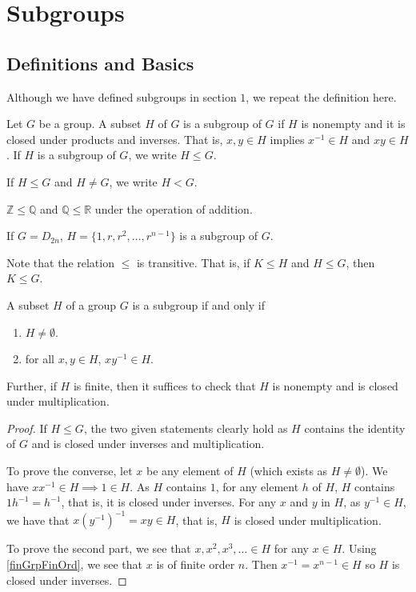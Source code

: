 \section{Subgroups}

\subsection{Definitions and Basics}
Although we have defined subgroups in section $1$, we repeat the definition here.
\begin{definition}
Let $G$ be a group. A subset $H$ of $G$ is a subgroup of $G$ if $H$ is nonempty and it is closed under products and inverses. That is, $x,y\in H$ implies $x^{-1}\in H$ and $xy\in H$. If $H$ is a subgroup of $G$, we write $H\leq G$.
\end{definition}

If $H\leq G$ and $H\neq G$, we write $H<G$.

\begin{example}
    $\mathbb{Z}\leq\mathbb{Q}$ and $\mathbb{Q}\leq\mathbb{R}$ under the operation of addition.
    
    If $G=D_{2n}$, $H=\{1,r,r^2,\ldots,r^{n-1}\}$ is a subgroup of $G$.
\end{example}

Note that the relation $\leq$ is transitive. That is, if $K\leq H$ and $H\leq G$, then $K\leq G$.

\begin{theorem}
A subset $H$ of a group $G$ is a subgroup if and only if
\begin{enumerate}
    \item $H\neq\emptyset$.
    \item for all $x,y\in H$, $xy^{-1}\in H$.
\end{enumerate}
Further, if $H$ is finite, then it suffices to check that $H$ is nonempty and is closed under multiplication.
\end{theorem}
\begin{proof}
    If $H\leq G$, the two given statements clearly hold as $H$ contains the identity of $G$ and is closed under inverses and multiplication.
    
    To prove the converse, let $x$ be any element of $H$ (which exists as $H\neq\emptyset$). We have $xx^{-1}\in H\implies 1\in H$. As $H$ contains $1$, for any element $h$ of $H$, $H$ contains $1h^{-1}=h^{-1}$, that is, it is closed under inverses. For any $x$ and $y$ in $H$, as $y^{-1}\in H$, we have that $x(y^{-1})^{-1}=xy\in H$, that is, $H$ is closed under multiplication.
    
    \vspace{1mm}
    To prove the second part, we see that $x,x^2,x^3,\ldots\in H$ for any $x\in H$. Using \ref{finGrpFinOrd}, we see that $x$ is of finite order $n$. Then $x^{-1}=x^{n-1}\in H$ so $H$ is closed under inverses.
\end{proof}

